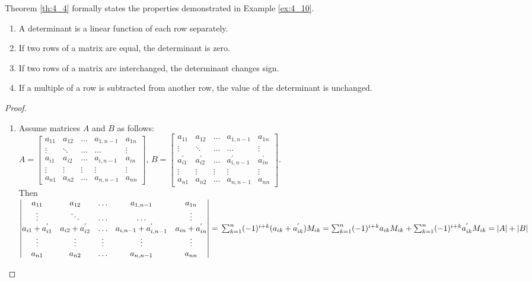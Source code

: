 \documentclass[../main.tex]{subfiles}
\begin{document}
Theorem \ref{th:4_4} formally states the properties demonstrated in Example \ref{ex:4_10}.
\begin{theorem} \label{th:4_4}
 \leavevmode
 \begin{enumerate}[leftmargin=*]
   \item A determinant is a linear function of each row separately.
   \item If two rows of a matrix are equal, the determinant is zero.
   \item If two rows of a matrix are interchanged, the determinant changes sign.
   \item If a multiple of a row is subtracted from another row, the value of the determinant is unchanged.
 \end{enumerate}
\end{theorem}
\begin{proof}
  \begin{enumerate}[leftmargin=*]
    \item Assume matrices \(A\) and \(B\) as follows:\\
    \(A =
      \begin{bmatrix}
        a_{11} & a_{12} & \hdots & a_{1,n-1} & a_{1n}\\
        \vdots & \ddots & \hdots & \hdots & \vdots\\
        a_{i1} & a_{i2} & \hdots & a_{i,n-1} & a_{in}\\
        \vdots & \vdots & \vdots & \vdots & \vdots\\
        a_{n1} & a_{n2} & \hdots & a_{n,n-1} & a_{nn}
      \end{bmatrix}
    \), \(B=
      \begin{bmatrix}
        a_{11} & a_{12} & \hdots & a_{1,n-1} & a_{1n}\\
        \vdots & \ddots & \hdots & \hdots & \vdots\\
        a_{i1}^{'} & a_{i2}^{'} & \hdots & a_{i,n-1}^{'} & a_{in}^{'}\\
        \vdots & \vdots & \vdots & \vdots & \vdots\\
        a_{n1} & a_{n2} & \hdots & a_{n,n-1} & a_{nn}
      \end{bmatrix}
    \).\\
    Then\\
    \(\begin{vmatrix}
      a_{11} & a_{12} & \hdots & a_{1,n-1} & a_{1n}\\
      \vdots & \ddots & \hdots & \hdots & \vdots\\
      a_{i1} + a_{i1}^{'} & a_{i2} + a_{i2}^{'} & \hdots & a_{i,n-1} + a_{i, n-1}^{'} & a_{in}+ a_{in}^{'}\\
      \vdots & \vdots & \vdots & \vdots & \vdots\\
      a_{n1} & a_{n2} & \hdots & a_{n,n-1} & a_{nn}
    \end{vmatrix}=\\    
    \sum^{n}_{k=1}(-1)^{i+k}(a_{ik} + a_{ik}^{'})M_{ik} = \sum^{n}_{k=1}(-1)^{i+k}a_{ik}M_{ik} + \sum^{n}_{k=1}(-1)^{i+k}a_{ik}^{'}M_{ik} =\\
    |A| + |B| 
    \)
    

\end{enumerate}
\end{proof}
\end{document}
